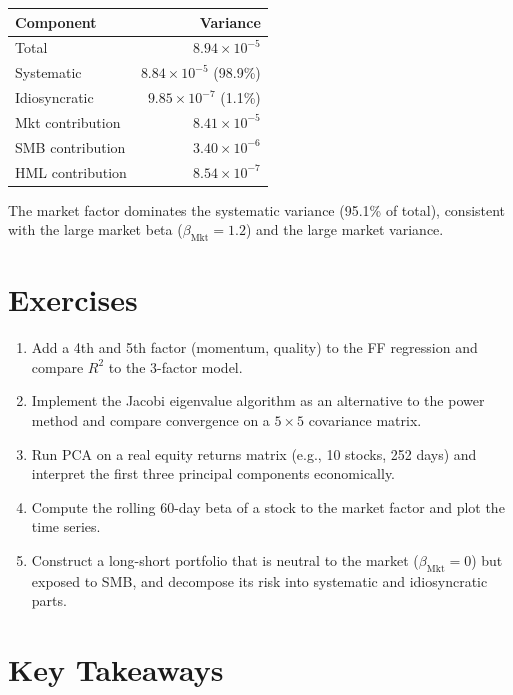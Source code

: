 \begin{center}
\begin{tabular}{lr}
\toprule
Component & Variance \\
\midrule
Total & $8.94 \times 10^{-5}$ \\
Systematic & $8.84 \times 10^{-5}$ (98.9\%) \\
Idiosyncratic & $9.85 \times 10^{-7}$ (1.1\%) \\
\midrule
Mkt contribution & $8.41 \times 10^{-5}$ \\
SMB contribution & $3.40 \times 10^{-6}$ \\
HML contribution & $8.54 \times 10^{-7}$ \\
\bottomrule
\end{tabular}
\end{center}

The market factor dominates the systematic variance (95.1\% of
total), consistent with the large market beta ($\beta_{\text{Mkt}} = 1.2$)
and the large market variance.

\section{Exercises}

\begin{enumerate}
    \item Add a 4th and 5th factor (momentum, quality) to the FF
      regression and compare $R^2$ to the 3-factor model.
    \item Implement the Jacobi eigenvalue algorithm as an alternative
      to the power method and compare convergence on a $5 \times 5$
      covariance matrix.
    \item Run PCA on a real equity returns matrix (e.g., 10 stocks,
      252 days) and interpret the first three principal components
      economically.
    \item Compute the rolling 60-day beta of a stock to the market
      factor and plot the time series.
    \item Construct a long-short portfolio that is neutral to the
      market ($\beta_{\text{Mkt}} = 0$) but exposed to SMB, and
      decompose its risk into systematic and idiosyncratic parts.
\end{enumerate}

\section{Key Takeaways}

